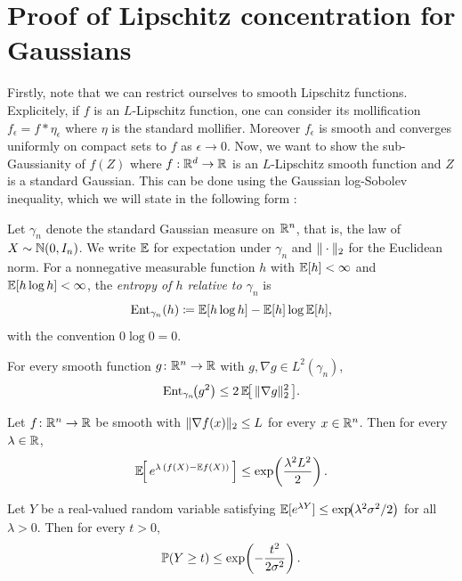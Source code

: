 \section{Proof of Lipschitz concentration for Gaussians}
Firstly, note that we can restrict ourselves to smooth Lipschitz functions. Explicitely, if $f$ is an $L$-Lipschitz function, one can consider its mollification $f_\epsilon = f * \eta_\epsilon$ where $\eta$ is the standard mollifier.
 Moreover $f_\epsilon$ is smooth and converges uniformly on compact sets to $f$ as $\epsilon \rightarrow 0$. Now, we want to show the sub-Gaussianity of $f(Z)$ where $f : \R^d \rightarrow \R$ is an $L$-Lipschitz smooth function and $Z$ is a standard Gaussian.
This can be done using the Gaussian log-Sobolev inequality, which we will state in the following form : 

Let $\gamma_n$ denote the standard Gaussian measure on $\R^n$, that is, the law
of $X \sim \N(0, I_n)$. We write $\E$ for expectation under $\gamma_n$ and
$\norm{\cdot}_2$ for the Euclidean norm. For a nonnegative measurable function
$h$ with $\E[h]<\infty$ and $\E[h\log h] < \infty$, the \emph{entropy of $h$
relative to $\gamma_n$} is
\[
    \text{Ent}_{\gamma_n}(h) \coloneqq \E[h \log h] - \E[h] \log \E[h],
\]
with the convention $0\log 0 = 0$.

\begin{lemma}
\label{lem:lsi}
For every smooth function $g \colon \R^n \to \R$ with $g, \nabla g \in L^2(\gamma_n)$,
\[
    \text{Ent}_{\gamma_n}\!\bigl( g^2 \bigr) \le 2\, \E\!\bigl[\, \norm{\nabla g}_2^2 \,\bigr] .
\]
\end{lemma}


\begin{lemma}
\label{lem:herbst}
Let $f \colon \R^n \to \R$ be smooth with $\norm{\nabla f(x)}_2 \le L$ for every
$x \in \R^n$. Then for every $\lambda \in \R$,
\[
    \E\!\Bigl[\, e^{\lambda\,(f(X) - \E f(X))} \,\Bigr] \le \exp\!\left( \frac{\lambda^2 L^2}{2} \right) .
\]
\end{lemma}

\begin{lemma}
\label{lem:chernoff}
Let $Y$ be a real-valued random variable satisfying
$\E[e^{\lambda Y}] \le \exp\!\bigl( \lambda^2 \sigma^2 / 2 \bigr)$ for all
$\lambda > 0$. Then for every $t > 0$,
\[
    \P(Y \ge t) \le \exp\!\left( -\frac{t^2}{2\sigma^2} \right) .
\]
\end{lemma}

